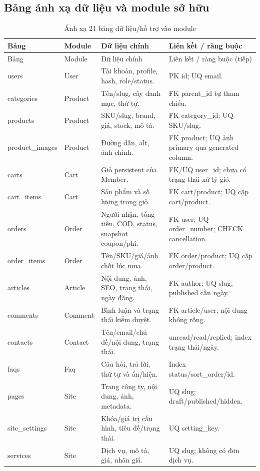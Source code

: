 \subsection{Bảng ánh xạ dữ liệu và module sở hữu}
{\small
\begin{longtable}{@{}P{3.1cm}P{2cm}P{4.8cm}P{4.6cm}@{}}
\caption{Ánh xạ 21 bảng dữ liệu/hỗ trợ vào module}\label{tab:data-mapping}\\
\toprule Bảng & Module & Dữ liệu chính & Liên kết / ràng buộc\\\midrule\endfirsthead
\toprule Bảng & Module & Dữ liệu chính & Liên kết / ràng buộc (tiếp)\\\midrule\endhead
users & User & Tài khoản, profile, hash, role/status. & PK id; UQ email.\\
categories & Product & Tên/slug, cây danh mục, thứ tự. & FK parent\_id tự tham chiếu.\\
products & Product & SKU/slug, brand, giá, stock, mô tả. & FK category\_id; UQ SKU/slug.\\
product\_images & Product & Đường dẫn, alt, ảnh chính. & FK product; UQ ảnh primary qua generated column.\\
carts & Cart & Giỏ persistent của Member. & FK/UQ user\_id; chưa có trạng thái xử lý giỏ.\\
cart\_items & Cart & Sản phẩm và số lượng trong giỏ. & FK cart/product; UQ cặp cart/product.\\
orders & Order & Người nhận, tổng tiền, COD, status, snapshot coupon/phí. & FK user; UQ order\_number; CHECK cancellation.\\
order\_items & Order & Tên/SKU/giá/ảnh chốt lúc mua. & FK order/product; UQ cặp order/product.\\
articles & Article & Nội dung, ảnh, SEO, trạng thái, ngày đăng. & FK author; UQ slug; published cần ngày.\\
comments & Comment & Bình luận và trạng thái kiểm duyệt. & FK article/user; nội dung không rỗng.\\
contacts & Contact & Tên/email/chủ đề/nội dung, trạng thái. & unread/read/replied; index trạng thái/ngày.\\
faqs & Faq & Câu hỏi, trả lời, thứ tự và ẩn/hiện. & Index status/sort\_order/id.\\
pages & Site & Trang công ty, nội dung, ảnh, metadata. & UQ slug; draft/published/hidden.\\
site\_settings & Site & Khóa/giá trị cấu hình, tiêu đề/trạng thái. & UQ setting\_key.\\
services & Site & Dịch vụ, mô tả, giá, nhãn giá. & UQ slug; không có đơn dịch vụ.\\

\end{longtable}}
